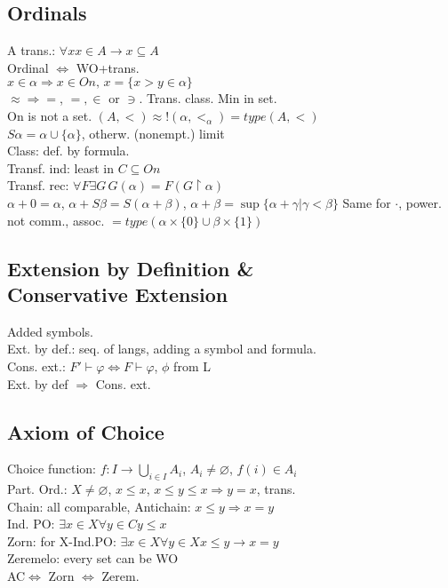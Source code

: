 \documentclass[twocolumn]{article}
\begin{document}
\subsection*{Ordinals}
A trans.: $\forall x x\in A\to x\subseteq A$\\
Ordinal $\Leftrightarrow$ WO+trans.\\
$x\in \alpha\Rightarrow x\in On,\,x=\{x>y\in \alpha\}$\\
$\approx\Rightarrow=$, $=,\in$ or $\ni$. Trans. class. Min in set.\\
On is not a set. $(A,<)\approx !(\alpha,<_\alpha)=type(A,<)$\\
$S\alpha=\alpha\cup\{\alpha\}$, otherw. (nonempt.) limit\\
Class: def. by formula.\\
Transf. ind: least in $C\subseteq On$\\
Transf. rec: $\forall F\exists G\,G(\alpha)=F(G\upharpoonright\alpha)$\\
$\alpha+0=\alpha$, $\alpha+S\beta=S(\alpha+\beta)$, $\alpha+\beta=\sup\{\alpha+\gamma|\gamma<\beta\}$
Same for $\cdot$, power.\\
not comm., assoc. $=type(\alpha\times\{0\}\cup\beta\times\{1\})$\\
\subsection*{Extension by Definition \&\\ Conservative Extension}
Added symbols.\\
Ext. by def.: seq. of langs, adding a symbol and formula.\\
Cons. ext.: $F'\vdash \varphi\Leftrightarrow F\vdash\varphi$, $\phi$ from L\\
Ext. by def $\Rightarrow$ Cons. ext.
\subsection*{Axiom of Choice}
Choice function: $f\colon I\to \bigcup\limits_{i\in I}A_i$, $A_i\neq\varnothing$, $f(i)\in A_i$\\
Part. Ord.: $X\neq\varnothing$, $x\leqslant x$, $x\leqslant y\leqslant x\Rightarrow y=x$, trans.\\
Chain: all comparable, Antichain: $x\leqslant y\Rightarrow x=y$\\
Ind. PO: $\exists x\in X\forall y\in C y\leqslant x$\\
Zorn: for X-Ind.PO: $\exists x\in X\forall y\in X x\leqslant y\rightarrow x=y$\\
Zeremelo: every set can be WO\\
AC$\Leftrightarrow$ Zorn $\Leftrightarrow$ Zerem.\\
\end{document}
